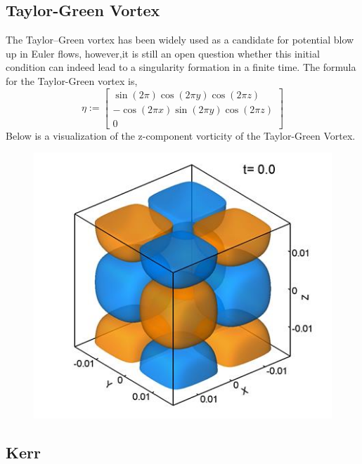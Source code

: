 \documentclass[12pt]{article}
\begin{document}
\begin{flushleft}
\subsection{Taylor-Green Vortex}

\qquad The Taylor–Green vortex has been widely used as a candidate for potential blow up in Euler flows, however,it is still an open question whether this initial condition can indeed lead to a singularity formation in a finite time. The formula for the Taylor-Green vortex is,
$$\eta := \begin{bmatrix}
\sin(2\pi)\cos(2\pi y)\cos(2\pi z)\\
-\cos(2\pi x)\sin(2\pi y)\cos(2\pi z)\\
0
\end{bmatrix}$$
Below is a visualization of the z-component vorticity of the Taylor-Green Vortex.

\begin{figure}[h!]
\centering
\includegraphics[scale=0.75]{Taylor_Green_Vortex.jpg}
\end{figure}


\subsection{Kerr}


\end{flushleft}
\end{document}
